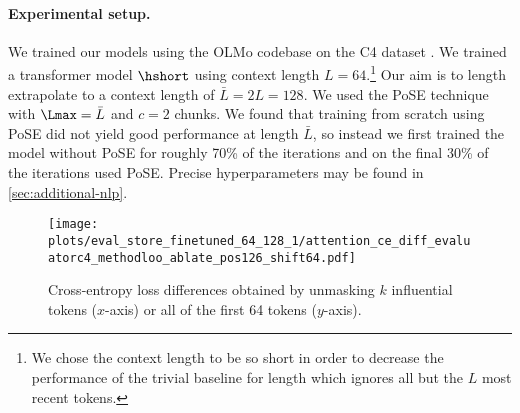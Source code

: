 \documentclass{article}
\newcommand{\arxiv}[1]{\iftoggle{icml}{}{#1}}
\begin{document}
\paragraph{Experimental setup.} We trained our models using the OLMo codebase \cite{groeneveld_olmo_2024} on the C4 dataset \cite{raffel_exploring_2019}. We trained a transformer model $\hshort$ %
using context length $L = 64$.\footnote{We chose the context length to be so short in order to decrease the performance of the trivial baseline for length \generalization which ignores all but the $L$ most recent tokens.} Our aim is to length extrapolate to a context length of $\bar L = 2L = 128$. 
We used the PoSE technique with $\Lmax = \bar L$ and $c = 2$ chunks. We found that training from scratch using PoSE did not yield good performance at length $\bar L$, so instead we first trained the model without PoSE for roughly 70\% of the iterations and on the final 30\% of the iterations used PoSE. Precise hyperparameters may be found in \cref{sec:additional-nlp}.

\begin{figure}[h]
    \centering    \texttt{[image: plots/eval\_store\_finetuned\_64\_128\_1/attention\_ce\_diff\_evaluatorc4\_methodloo\_ablate\_pos126\_shift64.pdf]}
    \caption{Cross-entropy loss differences obtained by unmasking $k$ influential tokens ($x$-axis) or all of the first 64 tokens ($y$-axis).}
    \label{fig:olmo-sparse}
  \end{figure}

\arxiv{}
\end{document}
